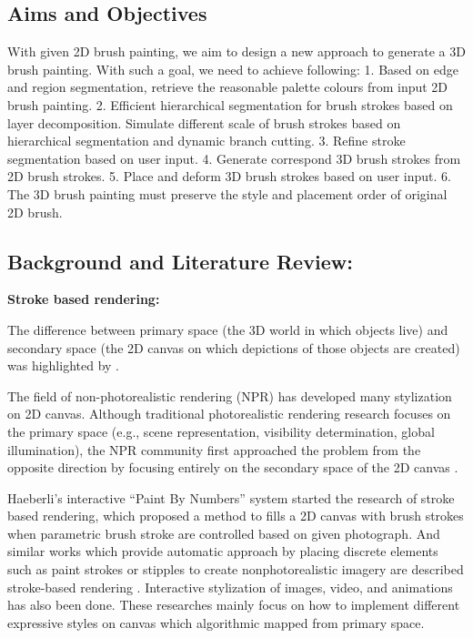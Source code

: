 \subsection{Aims and Objectives}
With given 2D brush painting, we aim to design a new approach to generate a 3D brush painting. With such a goal, we need to achieve following:
1. Based on edge and region segmentation, retrieve the reasonable palette colours from input 2D brush painting. 
2. Efficient hierarchical segmentation for brush strokes based on layer decomposition. 
Simulate different scale of brush strokes based on hierarchical segmentation and dynamic branch cutting.
3. Refine stroke segmentation based on user input.
4. Generate correspond 3D brush strokes from 2D brush strokes. 
5. Place and deform 3D brush strokes based on user input.
6. The 3D brush painting must preserve the style and placement order of original 2D brush. 
\subsection{Background and Literature Review:}  

\textbf{ Stroke based rendering:} \newline

The difference between primary space (the 3D world in which objects live) and secondary space (the 2D canvas on which depictions of those objects are created) was highlighted by \cite{schmid2011overcoat}. 

The field of non-photorealistic rendering (NPR) has developed many stylization on 2D canvas. Although traditional photorealistic rendering research focuses on the primary space (e.g., scene representation, visibility determination, global illumination), the NPR community first approached the problem from the opposite direction by focusing entirely on the secondary space of the 2D canvas \cite{hanrahan1990direct}. 

Haeberli’s interactive “Paint By Numbers” system \cite{haeberli1990paint} started the research of stroke based rendering, which proposed a method to fills a 2D canvas with brush strokes when parametric brush stroke are controlled based on given photograph. And similar works which provide automatic approach by placing discrete elements such as paint strokes or stipples to create nonphotorealistic imagery are described stroke-based rendering \cite{hertzmann2003survey} . Interactive stylization of images, video, and animations \cite{lu2010interactive} has also been done.  
These researches mainly focus on how to implement different expressive styles on canvas which algorithmic mapped from primary space. \newline

